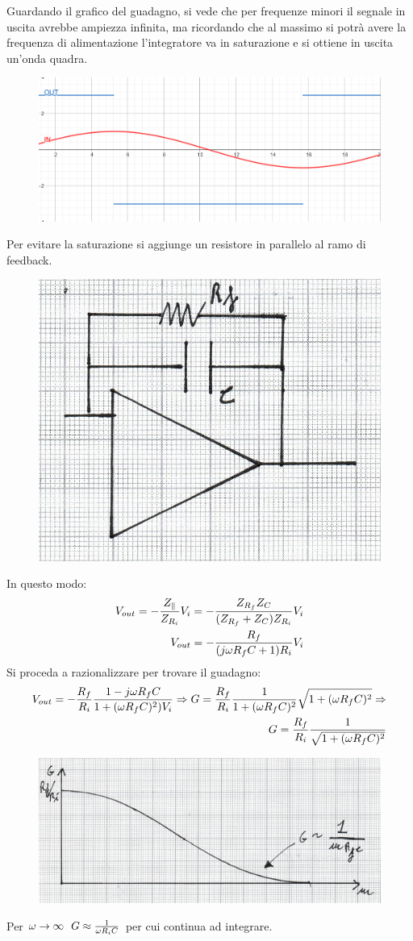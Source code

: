 \documentclass[a4paper, 15pt]{article}
\begin{document}
\begin{adjustwidth}{2in}{}
   		Guardando il grafico del guadagno, si vede che per frequenze minori il segnale in uscita avrebbe ampiezza infinita, ma ricordando che al massimo si potrà avere la frequenza di alimentazione l'integratore va in saturazione e si ottiene in uscita un'onda quadra. 
   		\begin{figure}[H]
   			\centering
   			\includegraphics[width=0.7\linewidth]{immagini/integratore3}   	
   			\label{fig:integratore3}
   		\end{figure} 
\newpage   		 	
   	 	Per evitare la saturazione si aggiunge un resistore in parallelo al ramo di feedback.   	 	
   	 	\begin{figure}[H]
   	 		\centering
   	 		\includegraphics[width=0.3\linewidth]{immagini/mm(9)}
   	 		\label{fig:mm9}
   	 	\end{figure}   	 	
   	 	In questo modo:
   	 	\begin{eqnarray*}
   	 		V_{out} = - {Z_{\parallel}\over Z_{R_i}}V_i = -{Z_{R_f}Z_C\over(Z_{R_f}+Z_C)Z_{R_i}}V_i \\
   	 		V_{out} = -{R_f\over(j\omega R_fC+1)R_i}V_i
   	 	\end{eqnarray*}   	
    	Si proceda a razionalizzare per trovare il guadagno:   	
   		\[\begin{split}
   			V_{out} = -{R_f\over R_i}\dfrac{1-j\omega R_fC}{1+(\omega R_fC)^2)V_i} \Rightarrow G = {R_f\over R_i} \dfrac{1}{1+(\omega R_fC)^2}\sqrt{1+(\omega R_fC)^2} \Rightarrow \\ G = {R_f\over R_i} \dfrac{1}{\sqrt{1+(\omega R_fC)^2}}
   		\end{split}\]   		
   		\begin{figure}[H]
   			\centering
   			\includegraphics[width=0.5\linewidth]{immagini/mm(10)}
   			\label{fig:mm10}
   		\end{figure}   		    		
   		Per $\omega\rightarrow\infty ~~ G\approx{1\over\omega R_iC}$ per cui continua ad integrare. 
   		

\end{adjustwidth}
\end{document}
